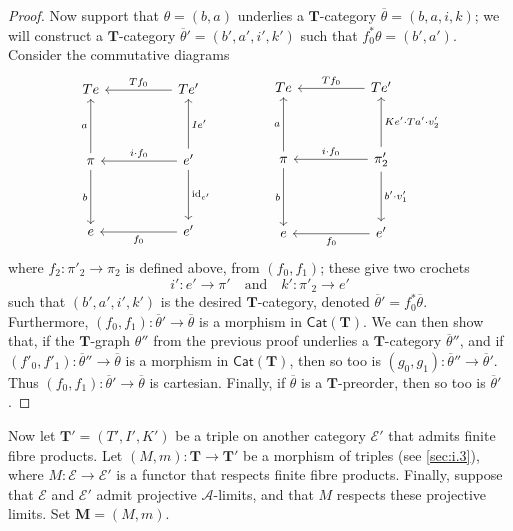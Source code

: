 \documentclass[fleqn]{article}
\newcommand{\id}{\mathrm{id}}
\newcommand{\TT}{\mathbf{T}}
\newcommand{\MM}{\mathbf{M}}
\newcommand{\textand}{\quad\text{and}\quad}
\newcommand{\cat}[1]{\mathcal{#1}}
\newcommand{\Cat}[1]{\mathsf{#1}}
\begin{document}
\begin{proof}
  Now support that $\theta=(b,a)$ underlies a $\TT$-category $\overline{\theta}=(b,a,i,k)$;
  we will construct a $\TT$-category $\overline{\theta}'=(b',a',i',k')$ such that $f_0^*\theta=(b',a')$.
  Consider the commutative diagrams
  \[
    \begin{tikzcd}[sep=huge]
      Te
    & Te'
        \ar[l,swap,"Tf_0"]
    \\\pi
        \ar[u,"a"]
        \ar[d,swap,"b"]
    & e'
        \ar[u,swap,"Ie'"]
        \ar[l,swap,"i\cdot f_0"]
        \ar[d,"\id_{e'}"]
    \\e
    & e'
        \ar[l,"f_0"]
    \end{tikzcd}
    \qquad\qquad
    \begin{tikzcd}[sep=huge]
      Te
    & Te'
        \ar[l,swap,"Tf_0"]
    \\\pi
        \ar[u,"a"]
        \ar[d,swap,"b"]
    & \pi'_2
        \ar[u,swap,"Ke'\cdot Ta'\cdot v'_2"]
        \ar[l,swap,"i\cdot f_0"]
        \ar[d,"b'\cdot v'_1"]
    \\e
    & e'
        \ar[l,"f_0"]
    \end{tikzcd}
  \]
  where $f_2\colon\pi'_2\to\pi_2$ is defined above, from $(f_0,f_1)$;
  these give two crochets
  \[
    i'\colon e'\to\pi'
    \textand
    k'\colon\pi'_2\to e'
  \]
  such that $(b',a',i',k')$ is the desired $\TT$-category, denoted $\overline{\theta}'=f_0^*\overline{\theta}$.
  Furthermore, $(f_0,f_1)\colon\overline{\theta}'\to\overline{\theta}$ is a morphism in $\Cat{Cat}(\TT)$.
  We can then show that, if the $\TT$-graph $\theta''$ from the previous proof underlies a $\TT$-category $\overline{\theta}''$, and if $(f'_0,f'_1)\colon\overline{\theta}''\to\overline{\theta}$ is a morphism in $\Cat{Cat}(\TT)$, then so too is $(g_0,g_1)\colon\overline{\theta}''\to\overline{\theta}'$.
  Thus $(f_0,f_1)\colon\overline{\theta}'\to\overline{\theta}$ is cartesian.
  Finally, if $\overline{\theta}$ is a $\TT$-preorder, then so too is $\overline{\theta}'$.
\end{proof}

Now let $\TT'=(T',I',K')$ be a triple on another category $\cat{E}'$ that admits finite fibre products.
Let $(M,m)\colon\TT\to\TT'$ be a morphism of triples (see \cref{sec:i.3}), where $M\colon\cat{E}\to\cat{E}'$ is a functor that respects finite fibre products.
Finally, suppose that $\cat{E}$ and $\cat{E}'$ admit projective $\cat{A}$-limits, and that $M$ respects these projective limits.
Set $\MM=(M,m)$.
\end{document}
